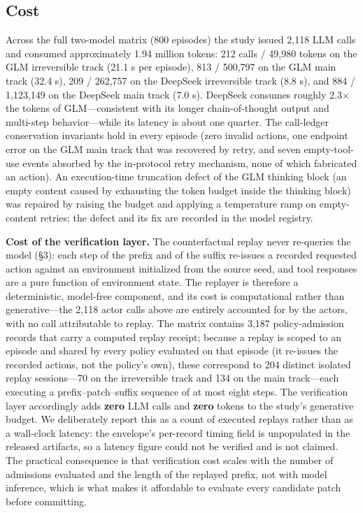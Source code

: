 \documentclass[review]{fcs}
\begin{document}
\subsection{Cost}

Across the full two-model matrix (800 episodes) the study issued 2,118 LLM calls and consumed approximately 1.94 million tokens: 212 calls / 49,980 tokens on the GLM irreversible track (21.1 s per episode), 813 / 500,797 on the GLM main track (32.4 s), 209 / 262,757 on the DeepSeek irreversible track (8.8 s), and 884 / 1,123,149 on the DeepSeek main track (7.0 s). DeepSeek consumes roughly 2.3$\times$ the tokens of GLM---consistent with its longer chain-of-thought output and multi-step behavior---while its latency is about one quarter. The call-ledger conservation invariants hold in every episode (zero invalid actions, one endpoint error on the GLM main track that was recovered by retry, and seven empty-tool-use events absorbed by the in-protocol retry mechanism, none of which fabricated an action). An execution-time truncation defect of the GLM thinking block (an empty content caused by exhausting the token budget inside the thinking block) was repaired by raising the budget and applying a temperature ramp on empty-content retries; the defect and its fix are recorded in the model registry.

\textbf{Cost of the verification layer.} The counterfactual replay never re-queries the model (\S3): each step of the prefix and of the suffix re-issues a recorded requested action against an environment initialized from the source seed, and tool responses are a pure function of environment state. The replayer is therefore a deterministic, model-free component, and its cost is computational rather than generative---the 2,118 actor calls above are entirely accounted for by the actors, with no call attributable to replay. The matrix contains 3,187 policy-admission records that carry a computed replay receipt; because a replay is scoped to an episode and shared by every policy evaluated on that episode (it re-issues the recorded actions, not the policy's own), these correspond to 204 distinct isolated replay sessions---70 on the irreversible track and 134 on the main track---each executing a prefix--patch--suffix sequence of at most eight steps. The verification layer accordingly adds \textbf{zero} LLM calls and \textbf{zero} tokens to the study's generative budget. We deliberately report this as a count of executed replays rather than as a wall-clock latency: the envelope's per-record timing field is unpopulated in the released artifacts, so a latency figure could not be verified and is not claimed. The practical consequence is that verification cost scales with the number of admissions evaluated and the length of the replayed prefix, not with model inference, which is what makes it affordable to evaluate every candidate patch before committing.
\end{document}
